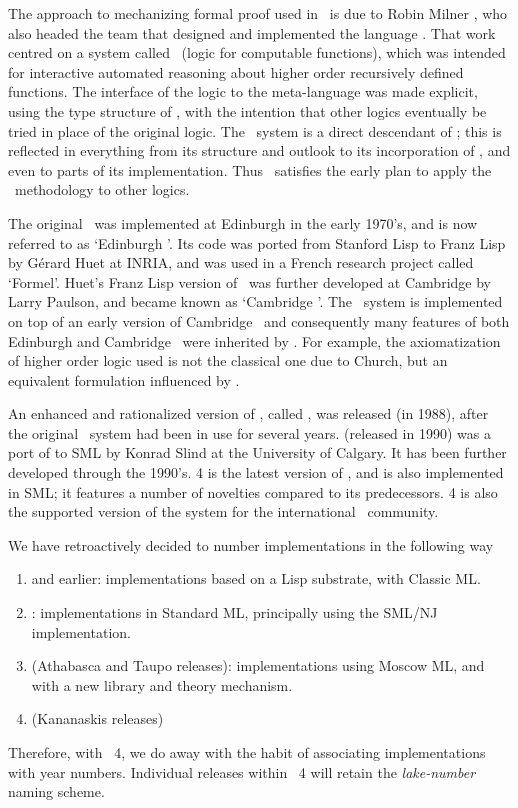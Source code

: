 The approach to mechanizing formal proof used in \HOL\ is due to Robin
Milner \cite{Edinburgh-LCF}, who also headed the team that designed
and implemented the language \ML.  That work centred on a system
called \LCF\ (logic for computable functions), which was intended for
interactive automated reasoning about higher order recursively defined
functions.  The interface of the logic to the meta-language was made
explicit, using the type structure of \ML, with the intention that
other logics eventually be tried in place of the original logic.  The
\HOL\ system is a direct descendant of \LCF; this is reflected in
everything from its structure and outlook to its incorporation of \ML,
and even to parts of its implementation.  Thus \HOL\ satisfies the
early plan to apply the \LCF\ methodology to other logics.

The original \LCF\ was implemented at Edinburgh in the early 1970's, and is now
referred to as `Edinburgh \LCF'. Its code was ported from Stanford Lisp to
Franz Lisp by G\'erard Huet at {\small INRIA}, and was used in a French
research project called `Formel'.  Huet's Franz Lisp version of \LCF\ was
further developed at Cambridge by Larry Paulson, and became known as `Cambridge
\LCF'. The \HOL\ system is implemented on top of an early version of Cambridge
\LCF\ and consequently many features of both Edinburgh and Cambridge \LCF\ were
inherited by \HOL. For example, the axiomatization of higher order logic used
is not the classical one due to Church, but an equivalent formulation
influenced by \LCF.

An enhanced and rationalized version of \HOL, called , was
released (in 1988), after the original \HOL\ system had been in use
for several years.   (released in 1990) was a port of 
to SML \cite{sml} by Konrad Slind at the University of Calgary. It has
been further developed through the 1990's. \HOL{} 4 is the latest
version of \HOL, and is also implemented in SML; it features a number
of novelties compared to its predecessors.  \HOL{} 4 is also the
supported version of the system for the international \HOL\ community.

We have retroactively decided to number \HOL{} implementations in the
following way
\begin{enumerate}
\item {} and earlier: implementations based on a Lisp substrate,
  with Classic ML.
\item {}: implementations in Standard ML, principally using the
  SML/NJ implementation.
\item {} (Athabasca and Taupo releases): implementations using
  Moscow ML, and with a new library and theory mechanism.
\item \HOL{} (Kananaskis releases)
\end{enumerate}
Therefore, with \HOL{}~4, we do away with the habit of associating
implementations with year numbers.  Individual releases within
\HOL{}~4 will retain the \textit{lake-number} naming scheme.

